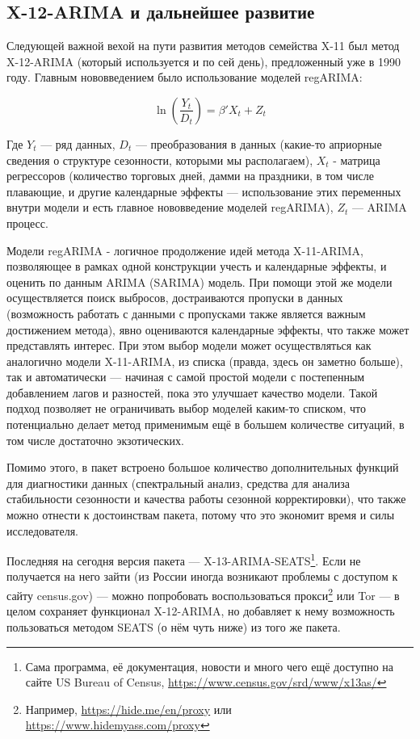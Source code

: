 \documentclass[final,pdftex]{../../template/epsilonj}\usepackage[]{graphicx}\usepackage[]{color}
\begin{document}
\subsection{X-12-ARIMA и дальнейшее развитие}

Следующей важной вехой на пути развития методов семейства X-11 был метод X-12-ARIMA (который используется и по сей день), предложенный уже в 1990 году. Главным нововведением было использование моделей regARIMA:

\[
\ln\left(\frac{Y_t}{D_t}\right) = \beta' X_t + Z_t
\]

Где $Y_t$ --- ряд данных, $D_t$ --- преобразования в данных (какие-то априорные сведения о структуре сезонности, которыми мы располагаем), $X_t$ - матрица регрессоров (количество торговых дней, дамми на праздники, в том числе плавающие, и другие календарные эффекты --- использование этих переменных внутри модели и есть главное нововведение моделей regARIMA), $Z_t$ --- ARIMA процесс. 

Модели regARIMA - логичное продолжение идей метода X-11-ARIMA, позволяющее в рамках одной конструкции учесть и календарные эффекты, и оценить по данным ARIMA (SARIMA) модель. При помощи этой же модели осуществляется поиск выбросов, достраиваются пропуски в данных (возможность работать с данными с пропусками также является важным достижением метода), явно оцениваются календарные эффекты, что также может представлять интерес. 
При этом выбор модели может осуществляться как аналогично модели X-11-ARIMA, из списка (правда, здесь он заметно больше), так и автоматически --- начиная с самой простой модели с постепенным добавлением лагов и разностей, пока это улучшает качество модели. Такой подход позволяет не ограничивать выбор моделей каким-то списком, что потенциально делает метод применимым ещё в большем количестве ситуаций, в том числе достаточно экзотических. 

Помимо этого, в пакет встроено большое количество дополнительных функций для диагностики данных (спектральный анализ, средства для анализа стабильности сезонности и качества работы сезонной корректировки), что также можно отнести к достоинствам пакета, потому что это экономит время и силы исследователя. 

Последняя на сегодня версия пакета --- X-13-ARIMA-SEATS\footnote{Сама программа, её документация, новости и много чего ещё доступно на сайте US Bureau of Census, \url{https://www.census.gov/srd/www/x13as/}}. Если не получается на него зайти (из России иногда возникают проблемы с доступом к сайту census.gov) --- можно попробовать воспользоваться прокси\footnote{Например, \url{https://hide.me/en/proxy} или \url{https://www.hidemyass.com/proxy}} или Tor --- в целом сохраняет функционал X-12-ARIMA, но добавляет к нему возможность пользоваться методом SEATS (о нём чуть ниже) из того же пакета. 
\end{document}
